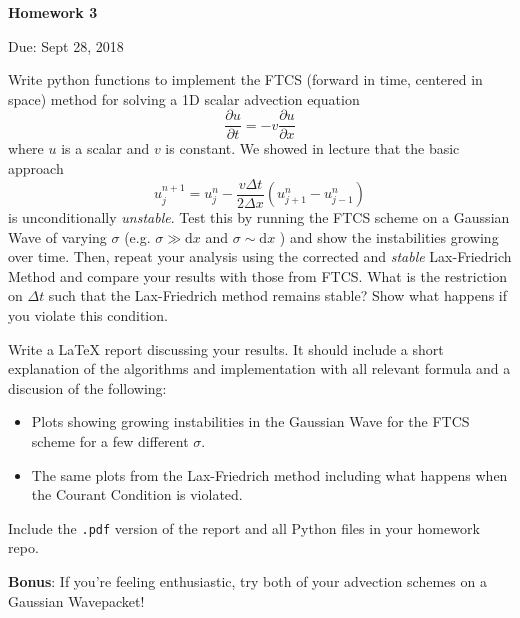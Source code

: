 \documentclass{article}
\begin{document}
\begin{center}

\vspace*{-2.5cm}
\LARGE
\bf{Homework 3}
\vspace{1cm}

\large{Due: Sept 28, 2018}
\vspace{1cm}

\end{center}

Write python functions to implement the FTCS (forward in time, centered in space) method for solving a 1D scalar advection equation
\begin{equation*}
   \frac{\partial u}{\partial t} = -v \frac{\partial u}{\partial x}
\end{equation*}
where $u$ is a scalar and $v$ is constant. We showed in lecture that the basic approach
\begin{equation*}
   u_j^{n+1} = u^n_j - \frac{v \Delta t}{2\Delta x} \left( u^n_{j+1} - u^n_{j-1} \right) 
\end{equation*}
is unconditionally \emph{unstable}. Test this by running the FTCS scheme on a Gaussian Wave of varying $\sigma$ (e.g. $\sigma \gg \mathrm{d}x$ and $\sigma \sim \mathrm{d}x$ ) and show the instabilities growing over time.  Then, repeat your analysis using the corrected and \emph{stable} Lax-Friedrich Method and compare your results with those from FTCS.  What is the restriction on $\Delta t$ such that the Lax-Friedrich method remains stable?  Show what happens if you violate this condition.
\par
Write a \LaTeX{} report discussing your results.  It should include a short explanation of the algorithms and implementation with all relevant formula and a discusion of the following:
\begin{itemize}
   \item Plots showing growing instabilities in the Gaussian Wave for the FTCS scheme for a few different $\sigma$.
   \item The same plots from the Lax-Friedrich method including what happens when the Courant Condition is violated.
\end{itemize}
Include the \texttt{.pdf} version of the report and all Python files in your homework repo.
\par
\vspace{1cm}
\textbf{Bonus}: If you're feeling enthusiastic, try both of your advection schemes on a Gaussian Wavepacket!
\end{document}
